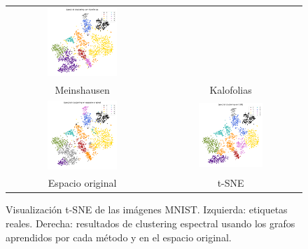 \documentclass{article}
\begin{document}
\begin{figure}[htb]
\begin{minipage}[t]{0.53\textwidth}
\begin{tabular}{cc}
            \includegraphics[width=0.48\textwidth]{imagenes/mnist/mnist_clustering_kalofolias.png} \\
            Meinshausen & Kalofolias \\
            \includegraphics[width=0.48\textwidth]{imagenes/mnist/mnist_clustering_original.png} &
            \includegraphics[width=0.48\textwidth]{imagenes/mnist/mnist_clustering_tsne.png} \\
            Espacio original & t-SNE \\
        \end{tabular}
    \end{minipage}
    \caption{Visualización t-SNE de las imágenes MNIST. Izquierda: etiquetas reales. Derecha: resultados de clustering espectral usando los grafos aprendidos por cada método y en el espacio original.}
    \label{fig:tsne_by_method}
\end{figure}
\end{document}

